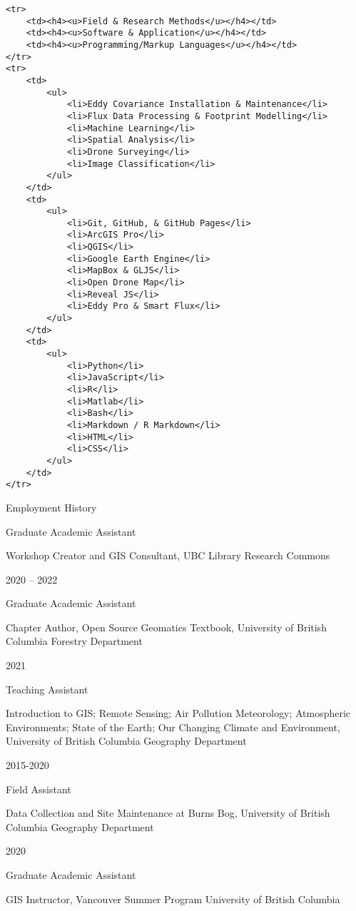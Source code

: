 \documentclass[
]{article}
\begin{document}
\begin{verbatim}
<tr>
    <td><h4><u>Field & Research Methods</u></h4></td>
    <td><h4><u>Software & Application</u></h4></td>
    <td><h4><u>Programming/Markup Languages</u></h4></td>
</tr>
<tr>
    <td>
        <ul>
            <li>Eddy Covariance Installation & Maintenance</li>
            <li>Flux Data Processing & Footprint Modelling</li>
            <li>Machine Learning</li>
            <li>Spatial Analysis</li>
            <li>Drone Surveying</li>
            <li>Image Classification</li>
        </ul>
    </td>
    <td>
        <ul>
            <li>Git, GitHub, & GitHub Pages</li>
            <li>ArcGIS Pro</li>
            <li>QGIS</li>
            <li>Google Earth Engine</li>
            <li>MapBox & GLJS</li>
            <li>Open Drone Map</li>
            <li>Reveal JS</li>
            <li>Eddy Pro & Smart Flux</li>
        </ul>
    </td>
    <td>
        <ul>
            <li>Python</li>
            <li>JavaScript</li>
            <li>R</li>
            <li>Matlab</li>
            <li>Bash</li>
            <li>Markdown / R Markdown</li>
            <li>HTML</li>
            <li>CSS</li>
        </ul>
    </td>   
</tr>
\end{verbatim}

Employment History

Graduate Academic Assistant

Workshop Creator and GIS Consultant, UBC Library Research Commons

2020 -- 2022

Graduate Academic Assistant

Chapter Author, Open Source Geomatics Textbook, University of British
Columbia Forestry Department

2021

Teaching Assistant

Introduction to GIS; Remote Sensing; Air Pollution Meteorology;
Atmospheric Environments; State of the Earth; Our Changing Climate and
Environment, University of British Columbia Geography Department

2015-2020

Field Assistant

Data Collection and Site Maintenance at Burns Bog, University of British
Columbia Geography Department

2020

Graduate Academic Assistant

GIS Instructor, Vancouver Summer Program University of British Columbia
\end{document}
